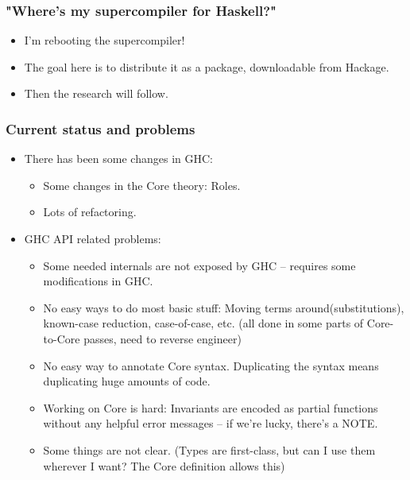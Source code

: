 \documentclass{beamer}
\begin{document}
\begin{frame}
    \frametitle{"Where's my supercompiler for Haskell?"}

    \begin{itemize}[<+->]
        \item
            I'm rebooting the supercompiler!

        \item
            The goal here is to distribute it as a package, downloadable from
            Hackage.

        \item
            Then the research will follow.
    \end{itemize}
\end{frame}

\begin{frame}
    \frametitle{Current status and problems}

    \begin{itemize}
        \item[]
            There has been some changes in GHC:

            \begin{itemize}
                \item
                    Some changes in the Core theory: Roles.
                \item
                    Lots of refactoring.
            \end{itemize}

        \item[]
            GHC API related problems:

            \begin{itemize}
                \item
                    Some needed internals are not exposed by GHC -- requires
                    some modifications in GHC.
                \item
                    No easy ways to do most basic stuff: Moving terms
                    around(substitutions), known-case reduction, case-of-case,
                    etc.  (all done in some parts of Core-to-Core passes, need
                    to reverse engineer)
                \item
                    No easy way to annotate Core syntax. Duplicating the syntax
                    means duplicating huge amounts of code.
                \item
                    Working on Core is hard: Invariants are encoded as partial
                    functions without any helpful error messages -- if we're
                    lucky, there's a NOTE.
                \item
                    Some things are not clear. (Types are first-class, but can I
                    use them wherever I want? The Core definition allows this)
            \end{itemize}

    \end{itemize}
\end{frame}
\end{document}
